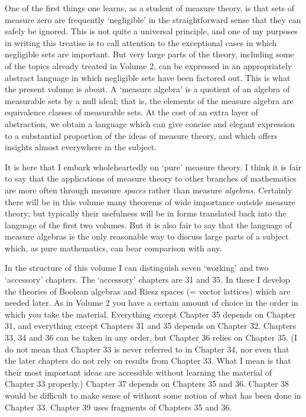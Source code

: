      
\def\volumename{Measure algebras}
     
     
One of the first things one learns, as a student of measure theory, is
that sets of measure zero are frequently `negligible' in the
straightforward sense that they can safely be ignored.   This is not
quite a universal principle, and one of my purposes in writing this
treatise is to call attention to the exceptional cases in which
negligible sets are important.   But very large parts of the theory,
including some of the topics already treated in Volume 2, can be
expressed in an appropriately abstract language in which negligible sets
have been factored out.   This is what the present volume is about.   A
`measure algebra' is a quotient of an algebra of measurable sets by a null ideal;  that is, the elements of the measure algebra
are equivalence classes of measurable sets.   At the cost of an extra
layer of abstraction, we obtain a language which can give concise and
elegant expression to a substantial proportion of the ideas of measure
theory, and which offers insights almost everywhere in the subject.
     
It is here that I embark wholeheartedly on `pure' measure theory.   I
think it is fair to say that the applications of measure theory to other
branches of mathematics are more often through measure {\it spaces}
rather than measure {\it algebras}.   Certainly there will be in this
volume many theorems of wide importance outside measure theory;  but
typically their usefulness will be in forms translated back into the
language of the first two volumes.   But it is also fair to say that the
language of measure algebras is the only reasonable way to discuss large
parts of a
subject which, as pure mathematics, can bear comparison with any.
     
In the structure of this volume I can distinguish seven `working' and
two `accessory' chapters.   The `accessory' chapters are 31 and
35.   In these I develop the theories of Boolean algebras
and Riesz spaces (= vector lattices) which are needed later.   As in
Volume 2 you have a certain amount of choice in the order in which you
take the material.   Everything except Chapter 35 depends on Chapter 31,
and everything except Chapters 31 and 35 depends on Chapter 32.
Chapters 33, 34 and 36 can be taken in any order, but Chapter 36 relies
on Chapter 35.   (I do not mean that Chapter 33 is never referred to in
Chapter 34, nor even that the later chapters do not rely on results from Chapter 33.   What I mean is that their most important ideas are
accessible without learning the material of Chapter 33 properly.)
Chapter 37 depends on Chapters 35 and 36.   Chapter 38 would be difficult to make sense of without
some notion of what has been done in Chapter 33.   Chapter 39 uses
fragments of Chapters 35 and 36.
     

